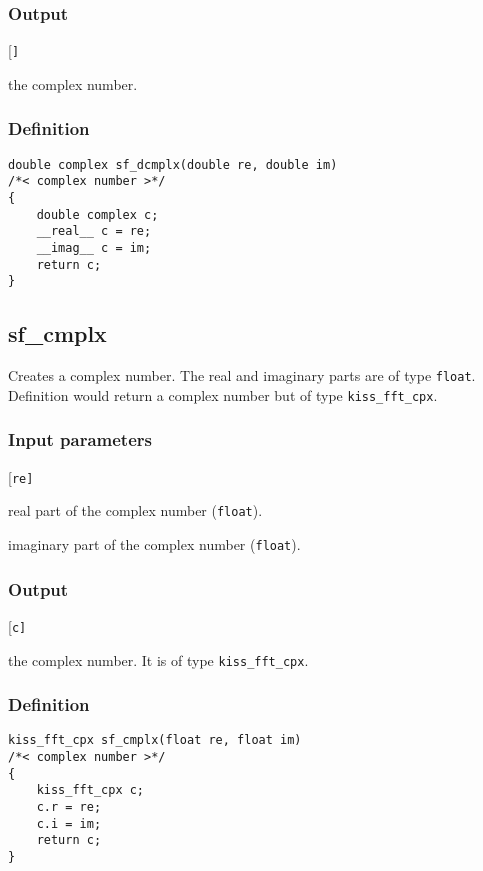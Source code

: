 \subsubsection*{Output}
\begin{desclist}{\tt }{\quad}[\tt ]
   \setlength\itemsep{0pt}
   \item[c] the complex number.
\end{desclist}

\subsubsection*{Definition}
\begin{verbatim}
double complex sf_dcmplx(double re, double im)
/*< complex number >*/
{
    double complex c;
    __real__ c = re;
    __imag__ c = im;
    return c;
}
\end{verbatim}




\subsection{{sf\_cmplx}}
Creates a complex number. The real and imaginary parts are of type \texttt{float}. Definition would return a complex number but of type \texttt{kiss\_fft\_cpx}.

\subsubsection*{Input parameters}
\begin{desclist}{\tt }{\quad}[\tt re]
   \setlength\itemsep{0pt}
   \item[re] real part of the complex number (\texttt{float}).
   \item[im] imaginary part of the complex number (\texttt{float}).
\end{desclist}

\subsubsection*{Output}
\begin{desclist}{\tt }{\quad}[\tt c]
   \setlength\itemsep{0pt}
   \item[c] the complex number. It is of type \texttt{kiss\_fft\_cpx}.
\end{desclist}

\subsubsection*{Definition}
\begin{verbatim}
kiss_fft_cpx sf_cmplx(float re, float im)
/*< complex number >*/
{
    kiss_fft_cpx c;
    c.r = re;
    c.i = im;
    return c;
}
\end{verbatim}




